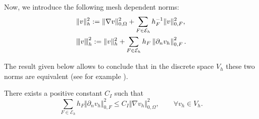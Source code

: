 \documentclass[onefignum,onetabnum,final]{siamart250211}
\numberwithin{equation}{section}
\newcommand\0{\boldsymbol{0}}
\renewcommand\O{\Omega}
\renewcommand\H{\mathrm{H}}
\def\CE{{\mathcal E}}
\newcommand{\vertiii}[1]{{\left\vert\kern-0.25ex\left\vert\kern-0.25ex\left\vert #1 
		\right\vert\kern-0.25ex\right\vert\kern-0.25ex\right\vert}}
\begin{document}
	Now, we introduce the following mesh dependent norms:
	\begin{align}
		\label{nomsdf}
		&\Vert v\Vert_h^2:=\Vert\nabla v\Vert_{0,\O}^2+\sum_{F\in\CE_h}h_F^{-1}\Vert v\Vert_{0,F}^2,\\
		&\vertiii{v}_h^2:=\Vert v\Vert_{h}^2
		+\sum_{F\in\CE_h}h_F\left\Vert\partial_n v_h\right\Vert_{0,F}^2.\label{nomsdf2}
	\end{align}
	
	The result given below allows to conclude that in the discrete space $V_h$ these two norms are equivalent (see for example \cite{juntunen2009nitsche}).
	\begin{lemma}\label{lem:inverse-inequality-normal-derivative}
		There exists a positive constant $C_I$ such that
		$$
		\sum_{F\in\CE_h} h_F\Vert \partial_n v_h\Vert_{0,F}^2\leq C_I\Vert \nabla v_h\Vert_{0,\Omega}^2, \qquad \forall v_h\in V_h.
		$$
	\end{lemma}
	
\end{document}
